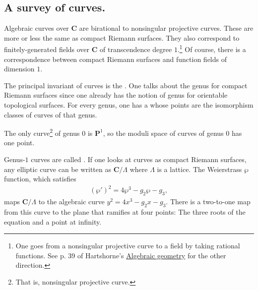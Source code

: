 \documentclass [11 pt, oneside] {article}
\begin{document}
\subsection{A survey of curves.}
Algebraic curves over $\mathbf{C}$ are birational to nonsingular projective curves. These are more or less the same as compact Riemann surfaces. They also correspond to finitely-generated fields over $\mathbf{C}$ of transcendence degree $1$.\footnote{One goes from a nonsingular projective curve to a field by taking rational functions. See p. 39 of Hartshorne's \ul{Algebraic geometry} for the other direction.} Of course, there is a correspondence between compact Riemann surfaces and function fields of dimension $1$.

The principal invariant of curves is the . One talks about the genus for compact Riemann surfaces since one already has the notion of genus for orientable topological surfaces. For every genus, one has a  whose points are the isomorphism classes of curves of that genus.

The only curve\footnote{That is, nonsingular projective curve.} of genus $0$ is $\mathbf{P}^1$, so the moduli space of curves of genus $0$ has one point.

Genus-$1$ curves are called . If one looks at curves as compact Riemann surfaces, any elliptic curve can be written as $\mathbf{C}/\Lambda$ where $\Lambda$ is a lattice. The Weierstrass $\wp$ function, which satisfies
\begin{align*}
	(\wp') ^2 = 4\wp^3 -g_2\wp-g_3,
\end{align*}
maps $\mathbf{C}/\Lambda$ to the algebraic curve $y^2=4x^3-g_2x-g_3$. There is a two-to-one map from this curve to the plane that ramifies at four points: The three roots of the equation and a point at infinity.
\end{document}
